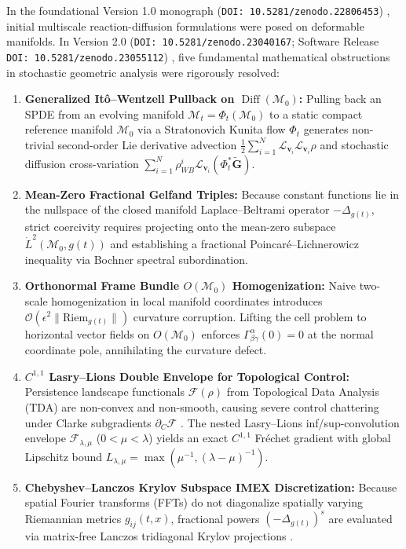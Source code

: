 \documentclass[11pt,a4paper,reqno]{article}
\theoremstyle{definition}
\theoremstyle{remark}
\begin{document}
In the foundational Version 1.0 monograph (\texttt{DOI: 10.5281/zenodo.22806453}) \cite{ghulame2026spde_v1}, initial multiscale reaction-diffusion formulations were posed on deformable manifolds. In Version 2.0 (\texttt{DOI: 10.5281/zenodo.23040167}; Software Release \texttt{DOI: 10.5281/zenodo.23055112}) \cite{ananda2026stochastic_fluid_v2, ananda2026stochastic_fluid_v2_software}, five fundamental mathematical obstructions in stochastic geometric analysis were rigorously resolved:
\begin{enumerate}
  \item \textbf{Generalized It\^o--Wentzell Pullback on $\operatorname{Diff}(\mathcal{M}_0)$:} Pulling back an SPDE from an evolving manifold $\mathcal{M}_t = \Phi_t(\mathcal{M}_0)$ to a static compact reference manifold $\mathcal{M}_0$ via a Stratonovich Kunita flow $\Phi_t$ generates non-trivial second-order Lie derivative advection $\frac{1}{2}\sum_{i=1}^N \mathcal{L}_{\mathbf{v}_i}\mathcal{L}_{\mathbf{v}_i}\rho$ and stochastic diffusion cross-variation $\sum_{i=1}^N \rho_{WB}^i \mathcal{L}_{\mathbf{v}_i}(\Phi_t^*\tilde{\mathbf{G}})$.
  \item \textbf{Mean-Zero Fractional Gelfand Triples:} Because constant functions lie in the nullspace of the closed manifold Laplace--Beltrami operator $-\Delta_{g(t)}$, strict coercivity requires projecting onto the mean-zero subspace $\dot{L}^2(\mathcal{M}_0, g(t))$ and establishing a fractional Poincar\'e--Lichnerowicz inequality via Bochner spectral subordination.
  \item \textbf{Orthonormal Frame Bundle $O(\mathcal{M}_0)$ Homogenization:} Naive two-scale homogenization in local manifold coordinates introduces $\mathcal{O}(\epsilon^2 \|\mathrm{Riem}_{g(t)}\|)$ curvature corruption. Lifting the cell problem to horizontal vector fields on $O(\mathcal{M}_0)$ enforces $\Gamma_{\beta\gamma}^\alpha(0) = 0$ at the normal coordinate pole, annihilating the curvature defect.
  \item \textbf{$C^{1,1}$ Lasry--Lions Double Envelope for Topological Control:} Persistence landscape functionals $\mathcal{F}(\rho)$ from Topological Data Analysis (TDA) \cite{bubenik2015statistical, cohen2007stability} are non-convex and non-smooth, causing severe control chattering under Clarke subgradients $\partial_C\mathcal{F}$ \cite{clarke1990optimization}. The nested Lasry--Lions inf/sup-convolution envelope $\mathcal{F}_{\lambda,\mu}$ ($0 < \mu < \lambda$) \cite{lasry1986remarks, attouch1993approximation} yields an exact $C^{1,1}$ Fr\'echet gradient with global Lipschitz bound $L_{\lambda,\mu} = \max(\mu^{-1}, (\lambda-\mu)^{-1})$.
  \item \textbf{Chebyshev--Lanczos Krylov Subspace IMEX Discretization:} Because spatial Fourier transforms (FFTs) do not diagonalize spatially varying Riemannian metrics $g_{ij}(t,x)$, fractional powers $(-\Delta_{g(t)})^s$ are evaluated via matrix-free Lanczos tridiagonal Krylov projections \cite{saad1992analysis, higham2008functions}.
\end{enumerate}
\end{document}
